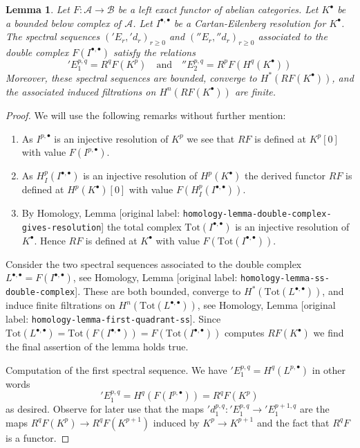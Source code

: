 \documentclass[10pt,a4paper]{article}
\theoremstyle{plain}
\newtheorem{lemma}[subsection]{Lemma}
\theoremstyle{definition}
\theoremstyle{remark}
\numberwithin{equation}{subsection}
\begin{document}
\begin{lemma}
\label{lemma-two-ss-complex-functor}
Let $F : \mathcal{A} \to \mathcal{B}$ be a left exact functor of
abelian categories.
Let $K^\bullet$ be a bounded below complex of $\mathcal{A}$.
Let $I^{\bullet, \bullet}$ be a Cartan-Eilenberg resolution
for $K^\bullet$. The spectral sequences
$({}'E_r, {}'d_r)_{r \geq 0}$ and $({}''E_r, {}''d_r)_{r \geq 0}$
associated to the double complex $F(I^{\bullet, \bullet})$
satisfy the relations
$$
{}'E_1^{p, q} = R^qF(K^p)
\quad
\text{and}
\quad
{}''E_2^{p, q} = R^pF(H^q(K^\bullet))
$$
Moreover, these spectral sequences are bounded, converge to
$H^*(RF(K^\bullet))$, and the associated induced filtrations on
$H^n(RF(K^\bullet))$ are finite.
\end{lemma}

\begin{proof}
We will use the following remarks without further mention:
\begin{enumerate}
\item As $I^{p, \bullet}$ is an injective resolution of
$K^p$ we see that $RF$ is defined at $K^p[0]$
with value $F(I^{p, \bullet})$.
\item As $H^p_I(I^{\bullet, \bullet})$ is an injective resolution of
$H^p(K^\bullet)$ the derived functor $RF$ is defined at $H^p(K^\bullet)[0]$
with value $F(H^p_I(I^{\bullet, \bullet}))$.
\item By
Homology, Lemma [original label: \nolinkurl{homology-lemma-double-complex-gives-resolution}]
the total complex $\text{Tot}(I^{\bullet, \bullet})$
is an injective resolution of
$K^\bullet$. Hence $RF$ is defined at $K^\bullet$ with value
$F(\text{Tot}(I^{\bullet, \bullet}))$.
\end{enumerate}
Consider the two spectral sequences associated to the double complex
$L^{\bullet, \bullet} = F(I^{\bullet, \bullet})$, see
Homology, Lemma [original label: \nolinkurl{homology-lemma-ss-double-complex}].
These are both bounded, converge to $H^*(\text{Tot}(L^{\bullet, \bullet}))$,
and induce finite filtrations on $H^n(\text{Tot}(L^{\bullet, \bullet}))$, see
Homology, Lemma [original label: \nolinkurl{homology-lemma-first-quadrant-ss}].
Since
$\text{Tot}(L^{\bullet, \bullet}) =
\text{Tot}(F(I^{\bullet, \bullet})) =
F(\text{Tot}(I^{\bullet, \bullet}))$ computes
$RF(K^\bullet)$ we find the final assertion of the lemma holds true.

\medskip\noindent
Computation of the first spectral sequence. We have
${}'E_1^{p, q} = H^q(L^{p, \bullet})$ in other words
$$
{}'E_1^{p, q} = H^q(F(I^{p, \bullet})) = R^qF(K^p)
$$
as desired. Observe for later use that the maps
${}'d_1^{p, q} : {}'E_1^{p, q} \to {}'E_1^{p + 1, q}$ are the maps
$R^qF(K^p) \to R^qF(K^{p + 1})$ induced by $K^p \to K^{p + 1}$
and the fact that $R^qF$ is a functor.


\end{proof}
\end{document}
